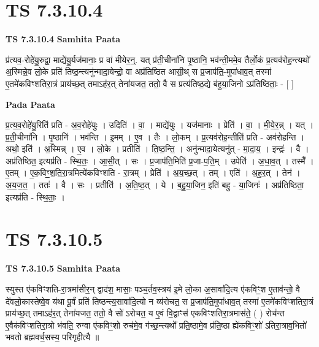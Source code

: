 \documentclass[17pt]{extarticle}
\begin{document}

\section{ TS 7.3.10.4 }

\textbf{TS 7.3.10.4 } \newline
\textbf{Samhita Paata} \newline

प्र॑त्यव॒-रोहे॑यु॒रुद्वा॒ माद्ये॑यु॒र्यज॑मानाः॒ प्र वा॑ मीयेर॒न्॒. यत् प्र॑ती॒चीना॑नि पृ॒ष्ठानि॒ भव॑न्ती॒ममे॒व तैर्लो॒कं प्र॒त्यव॑रोह॒न्त्यथो॑ अ॒स्मिन्ने॒व लो॒के प्रति॑ तिष्ठ॒न्त्यनु॑न्मादा॒येन्द्रो॒ वा अप्र॑तिष्ठित आसी॒थ् स प्र॒जाप॑ति॒-मुपा॑धाव॒त् तस्मा॑ ए॒तमे॑कविꣳशतिरा॒त्रं प्राय॑च्छ॒त् तमाऽह॑र॒त् तेना॑यजत॒ ततो॒ वै स प्रत्य॑तिष्ठ॒द्ये ब॑हुया॒जिनो ऽप्र॑तिष्ठिताः॒ - [  ] \newline

\textbf{Pada Paata} \newline

प्र॒त्य॒व॒रोहे॑यु॒रिति॑ प्रति - अ॒व॒रोहे॑युः । उदिति॑ । वा॒ । माद्ये॑युः । यज॑मानाः । प्रेति॑ । वा॒ । मी॒ये॒र॒न्न् । यत् । प्र॒ती॒चीना॑नि । पृ॒ष्ठानि॑ । भव॑न्ति । इ॒मम् । ए॒व । तैः । लो॒कम् । प्र॒त्यव॑रोह॒न्तीति॑ प्रति - अव॑रोहन्ति । अथो॒ इति॑ । अ॒स्मिन्न् । ए॒व । लो॒के । प्रतीति॑ । ति॒ष्ठ॒न्ति॒ । अनु॑न्मादा॒येत्यनु॑त् - मा॒दा॒य॒ । इन्द्रः॑ । वै । अप्र॑तिष्ठित॒ इत्यप्र॑ति - स्थि॒तः॒ । आ॒सी॒त् । सः । प्र॒जाप॑ति॒मिति॑ प्र॒जा-प॒ति॒म् । उपेति॑ । अ॒धा॒व॒त् । तस्मै᳚ । ए॒तम् । ए॒क॒विꣳ॒॒श॒ति॒रा॒त्रमित्ये॑कविꣳशति - रा॒त्रम् । प्रेति॑ । अ॒य॒च्छ॒त् । तम् । एति॑ । अ॒ह॒र॒त् । तेन॑ । अ॒य॒ज॒त॒ । ततः॑ । वै । सः । प्रतीति॑ । अ॒ति॒ष्ठ॒त् । ये । ब॒हु॒या॒जिन॒ इति॑ बहु - या॒जिनः॑ । अप्र॑तिष्ठिता॒ इत्यप्र॑ति - स्थि॒ताः॒ ।  \newline





\section{ TS 7.3.10.5 }

\textbf{TS 7.3.10.5 } \newline
\textbf{Samhita Paata} \newline

स्युस्त ए॑कविꣳशति-रा॒त्रमा॑सीर॒न् द्वाद॑श॒ मासाः॒ पञ्च॒र्तव॒स्त्रय॑ इ॒मे लो॒का अ॒सावा॑दि॒त्य ए॑कविꣳ॒॒श ए॒ताव॑न्तो॒ वै दे॑वलो॒कास्तेष्वे॒व य॑था पू॒र्वं प्रति॑ तिष्ठन्त्य॒सावा॑दि॒त्यो न व्य॑रोचत॒ स प्र॒जाप॑ति॒मुपा॑धाव॒त् तस्मा॑ ए॒तमे॑कविꣳशतिरा॒त्रं प्राय॑च्छ॒त् तमाऽह॑र॒त् तेना॑यजत॒ ततो॒ वै सो॑ ऽरोचत॒ य ए॒वं वि॒द्वाꣳस॑ एकविꣳशतिरा॒त्रमास॑ते॒ ( ) रोच॑न्त ए॒वैक॑विꣳशतिरा॒त्रो भ॑वति॒ रुग्वा ए॑कविꣳ॒॒शो रुच॑मे॒व ग॑च्छ॒न्त्यथो᳚ प्रति॒ष्ठामे॒व प्र॑ति॒ष्ठा ह्ये॑कविꣳ॒॒शो॑ ऽतिरा॒त्राव॒भितो॑ भवतो ब्रह्मवर्च॒सस्य॒ परि॑गृहीत्यै ॥ \newline
\end{document}
